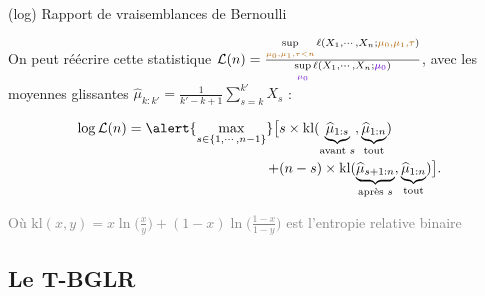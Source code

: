 \documentclass[11pt,french,ignorenonframetext,]{beamer}
\begin{document}
\begin{frame}{(log) Rapport de vraisemblances de Bernoulli}

  On peut réécrire cette statistique
  $\mathcal{L}(n) = \frac{\sup\limits_{\textcolor{gold}{\mu_0,\mu_1,\tau < n}}\ell(X_1,\cdots,X_n ; \textcolor{gold}{\mu_0,\mu_1,\tau})}{\sup\limits_{\textcolor{deeppurple}{\mu_0}}\ell(X_1,\cdots,X_n ;\textcolor{deeppurple}{\mu_0})}$,
  avec les moyennes glissantes $\widehat{\mu}_{k:k'} = \frac{1}{k'-k+1} \sum\limits_{s=k}^{k'} X_s$ :

  \begin{align*}
    \log \mathcal{L}(n) = \alert{\max_{s \in \{1,\cdots,n-1\}}} \bigl[
      & s \times \mathrm{kl} (\underbrace{\widehat{\mu}_{1:s}}_{\text{avant } s},\underbrace{\widehat{\mu}_{1:n}}_{\text{tout}} ) \\
      + & (n-s) \times \mathrm{kl} (\underbrace{\widehat{\mu}_{s+1:n}}_{\text{après } s},\underbrace{\widehat{\mu}_{1:n}}_{\text{tout}} ) \bigr].
  \end{align*}

  \begin{small}
    \textcolor{gray}{Où $\mathrm{kl}(x,y) =x \ln\bigl(\frac{x}{y}\bigr) + (1-x)\ln\bigl(\frac{1-x}{1-y}\bigr)$ est l'entropie relative binaire}
  \end{small}

\end{frame}


\subsection{\hfill{}Le T-BGLR\hfill{}}


\end{document}
